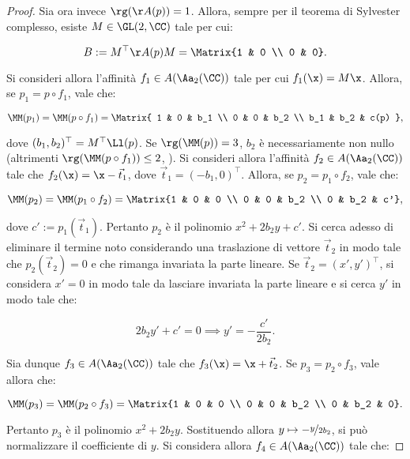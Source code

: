 \documentclass[11pt]{article}
\begin{document}
\begin{proof}
		Sia ora invece $\rg(\AA(p)) = 1$. Allora, sempre per
		il teorema di Sylvester complesso, esiste $M \in \GL(2, \CC)$
		tale per cui:
		
		\[ B := M^\top \AA(p) M = \Matrix{1 & 0 \\ 0 & 0}. \]
		
		\vskip 0.05in
		
		Si consideri allora l'affinità $f_1 \in A(\Aa_2(\CC))$ tale
		per cui $f_1(\x) = M \x$. Allora, se $p_1 = p \circ f_1$, vale che:
		
		\[ \MM(p_1) = \MM(p \circ f_1) = \Matrix{ 1 & 0 & b_1 \\ 0 & 0 & b_2 \\ b_1 & b_2 & c(p) }, \]
		
		\vskip 0.05in
		
		dove $(b_1, b_2)^\top = M^\top \Ll(p)$. Se $\rg(\MM(p)) = 3$, $b_2$ è necessariamente non nullo (altrimenti
		$\rg(\MM(p \circ f_1)) \leq 2$, \Lightning). Si consideri
		allora l'affinità $f_2 \in A(\Aa_2(\CC))$ tale che
		$f_2(\x) = \x - \vec t_1$, dove $\vec t_1 = (-b_1, 0)^\top$.
		Allora, se $p_2 = p_1 \circ f_2$, vale che:
		
		\[ \MM(p_2) = \MM(p_1 \circ f_2) = \Matrix{1 & 0 & 0 \\ 0 & 0 & b_2 \\ 0 & b_2 & c'}, \]
		
		\vskip 0.05in
		
		dove $c' := p_1(\vec t_1)$. Pertanto $p_2$ è il polinomio
		$x^2 + 2b_2 y + c'$. Si cerca adesso di eliminare il termine
		noto considerando una traslazione di vettore $\vec t_2$ in
		modo tale che $p_2(\vec t_2) = 0$ e che rimanga invariata
		la parte lineare. Se $\vec t_2 = (x', y')^\top$, si considera
		$x' = 0$ in modo tale da lasciare invariata la parte lineare
		e si cerca $y'$ in modo tale che:
		
		\[ 2b_2 y' + c' = 0 \implies y' = -\frac{c'}{2 b_2}. \]
		
		\vskip 0.05in
		
		Sia dunque $f_3 \in A(\Aa_2(\CC))$ tale che $f_3(\x) = \x + \vec t_2$. Se $p_3 = p_2 \circ f_3$, vale allora che:
		
		\[ \MM(p_3) = \MM(p_2 \circ f_3) = \Matrix{1 & 0 & 0 \\ 0 & 0 & b_2 \\ 0 & b_2 & 0}. \]
		
		\vskip 0.05in
		
		Pertanto $p_3$ è il polinomio $x^2 + 2b_2 y$. Sostituendo
		allora $y \mapsto -\nicefrac{y}{2b_2}$, si può normalizzare il
		coefficiente di $y$. Si considera allora $f_4 \in A(\Aa_2(\CC))$ tale che:
		

\end{proof}
\end{document}
